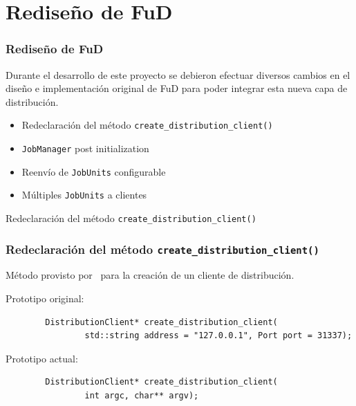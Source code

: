 \section{Rediseño de FuD}


\begin{frame}\frametitle{Rediseño de FuD}	
	\begin{block}{}
		Durante el desarrollo de este proyecto se debieron efectuar diversos cambios en el diseño e implementación 
		original de FuD para poder integrar esta nueva capa de distribución.
	\end{block}
	\vspace{4mm}
	\begin{itemize}\addtolength{\itemsep}{4mm}
		\item Redeclaración del método \texttt{create\_distribution\_client()}
		\item \texttt{JobManager} post initialization
		\item Reenvío de \texttt{JobUnits} configurable
		\item Múltiples \texttt{JobUnits} a clientes
	\end{itemize}
\end{frame}


\begin{subsection}{Redeclaración del método \texttt{create\_distribution\_client()}}

	\begin{frame}[fragile]\frametitle{Redeclaración del método \texttt{create\_distribution\_client()}}	
		\begin{block}{}
			Método provisto por \fud \ para la creación de un cliente de distribución.
		\end{block}
		\vspace{4mm}
		Prototipo original:
		\begin{lstlisting}
		DistributionClient* create_distribution_client(
		        std::string address = "127.0.0.1", Port port = 31337);
		\end{lstlisting}
		\vspace{4mm}		
		Prototipo actual:
		\begin{lstlisting}
		DistributionClient* create_distribution_client(
		        int argc, char** argv);
   		\end{lstlisting}
	\end{frame}

\end{subsection}


